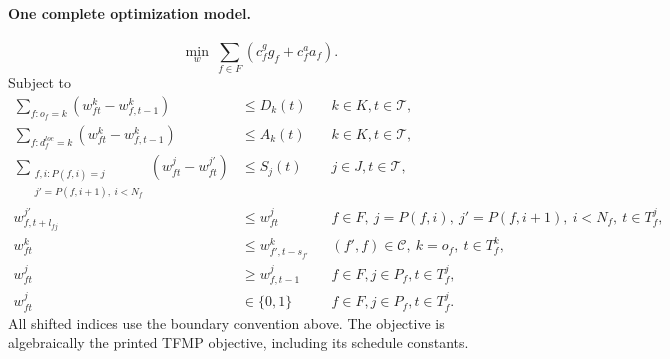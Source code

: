 \documentclass[11pt]{article}
\begin{document}
\paragraph{One complete optimization model.}
\[
\min_w\ \sum_{f\in F}(c_f^g g_f+c_f^a a_f).
\]
Subject to
\begin{align}
\sum_{f:o_f=k}(w_{ft}^k-w_{f,t-1}^k)&\le D_k(t)
 &&k\in K,t\in\mathcal T,\tag{2}\\
\sum_{f:d_f^{loc}=k}(w_{ft}^k-w_{f,t-1}^k)&\le A_k(t)
 &&k\in K,t\in\mathcal T,\tag{3}\\
\sum_{\substack{f,i:P(f,i)=j\\j'=P(f,i+1),\ i<N_f}}
 (w_{ft}^{j}-w_{ft}^{j'})&\le S_j(t)
 &&j\in J,t\in\mathcal T,\tag{4}\\
w_{f,t+l_{fj}}^{j'}&\le w_{ft}^{j}
 &&f\in F,\ j=P(f,i),\ j'=P(f,i+1),\ i<N_f,\ t\in T_f^j,\tag{5}\\
w_{ft}^{k}&\le w_{f',t-s_{f'}}^{k}
 &&(f',f)\in\mathcal C,\ k=o_f,\ t\in T_f^k,\tag{6}\\
w_{ft}^{j}&\ge w_{f,t-1}^{j}
 &&f\in F,j\in P_f,t\in T_f^j,\tag{7}\\
w_{ft}^{j}&\in\{0,1\}
 &&f\in F,j\in P_f,t\in T_f^j.\tag{8}
\end{align}
All shifted indices use the boundary convention above. The objective is
algebraically the printed TFMP objective, including its schedule constants.
\end{document}
